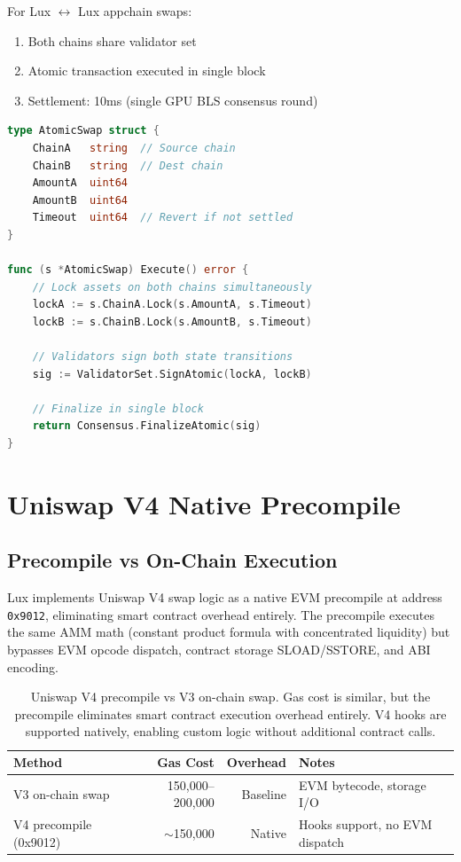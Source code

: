 \documentclass[11pt,letterpaper]{article}
\begin{document}
For Lux $\leftrightarrow$ Lux appchain swaps:

\begin{enumerate}
    \item Both chains share validator set
    \item Atomic transaction executed in single block
    \item Settlement: 10ms (single GPU BLS consensus round)
\end{enumerate}

\begin{lstlisting}[language=Go]
type AtomicSwap struct {
    ChainA   string  // Source chain
    ChainB   string  // Dest chain
    AmountA  uint64
    AmountB  uint64
    Timeout  uint64  // Revert if not settled
}

func (s *AtomicSwap) Execute() error {
    // Lock assets on both chains simultaneously
    lockA := s.ChainA.Lock(s.AmountA, s.Timeout)
    lockB := s.ChainB.Lock(s.AmountB, s.Timeout)
    
    // Validators sign both state transitions
    sig := ValidatorSet.SignAtomic(lockA, lockB)
    
    // Finalize in single block
    return Consensus.FinalizeAtomic(sig)
}
\end{lstlisting}

\section{Uniswap V4 Native Precompile}

\subsection{Precompile vs On-Chain Execution}

Lux implements Uniswap V4 swap logic as a native EVM precompile at address
\texttt{0x9012}, eliminating smart contract overhead entirely. The precompile
executes the same AMM math (constant product formula with concentrated liquidity)
but bypasses EVM opcode dispatch, contract storage SLOAD/SSTORE, and ABI encoding.

\begin{table}[h]
\centering
\begin{tabular}{lrrl}
\toprule
\textbf{Method} & \textbf{Gas Cost} & \textbf{Overhead} & \textbf{Notes} \\
\midrule
V3 on-chain swap         & 150{,}000--200{,}000 & Baseline & EVM bytecode, storage I/O \\
V4 precompile (0x9012)   & $\sim$150{,}000      & Native   & Hooks support, no EVM dispatch \\
\bottomrule
\end{tabular}
\caption{Uniswap V4 precompile vs V3 on-chain swap. Gas cost is similar, but the
precompile eliminates smart contract execution overhead entirely. V4 hooks are
supported natively, enabling custom logic without additional contract calls.}
\end{table}
\end{document}

